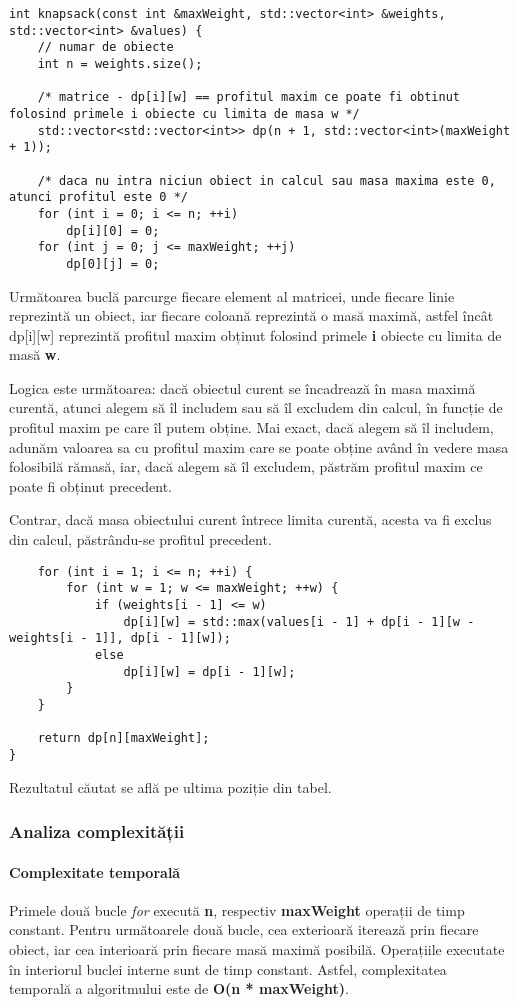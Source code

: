 \documentclass[runningheads]{llncs}
\begin{document}
\begin{lstlisting}
int knapsack(const int &maxWeight, std::vector<int> &weights, std::vector<int> &values) {
	// numar de obiecte
	int n = weights.size();

	/* matrice - dp[i][w] == profitul maxim ce poate fi obtinut folosind primele i obiecte cu limita de masa w */
	std::vector<std::vector<int>> dp(n + 1, std::vector<int>(maxWeight + 1));

	/* daca nu intra niciun obiect in calcul sau masa maxima este 0, atunci profitul este 0 */
	for (int i = 0; i <= n; ++i)
		dp[i][0] = 0;
	for (int j = 0; j <= maxWeight; ++j)
		dp[0][j] = 0;
\end{lstlisting}

Următoarea buclă parcurge fiecare element al matricei, unde fiecare linie
reprezintă un obiect, iar fiecare coloană reprezintă o masă maximă, astfel
încât dp[i][w] reprezintă profitul maxim obținut folosind primele \textbf{i}
obiecte cu limita de masă \textbf{w}.

Logica este următoarea: dacă obiectul curent
se încadrează în masa maximă curentă, atunci alegem să îl includem sau să îl
excludem din calcul, în funcție de profitul maxim pe care îl putem obține. Mai exact,
dacă alegem să îl includem, adunăm valoarea sa cu profitul maxim care se poate obține
având în vedere masa folosibilă rămasă, iar, dacă alegem să îl excludem, păstrăm profitul
maxim ce poate fi obținut precedent.

Contrar, dacă masa obiectului curent întrece limita curentă, acesta va fi exclus din calcul,
păstrându-se profitul precedent.

\begin{lstlisting}
	for (int i = 1; i <= n; ++i) {
		for (int w = 1; w <= maxWeight; ++w) {
			if (weights[i - 1] <= w)
				dp[i][w] = std::max(values[i - 1] + dp[i - 1][w - weights[i - 1]], dp[i - 1][w]);
			else
				dp[i][w] = dp[i - 1][w];
		}
	}

	return dp[n][maxWeight];
}
\end{lstlisting}

Rezultatul căutat se află pe ultima poziție din tabel.

\subsubsection{Analiza complexității}

\paragraph{Complexitate temporală} Primele două bucle \textit{for} execută \textbf{n},
respectiv \textbf{maxWeight} operații de timp constant. Pentru următoarele două bucle,
cea exterioară iterează prin fiecare obiect, iar cea interioară prin fiecare masă maximă
posibilă. Operațiile executate în interiorul buclei interne sunt de timp constant. Astfel,
complexitatea temporală a algoritmului este de \textbf{O(n * maxWeight)}.
\end{document}
